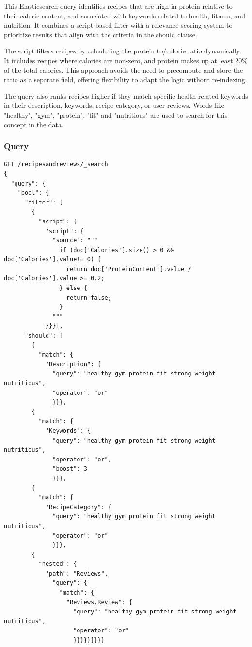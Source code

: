 \begin{enumerate}
    This Elasticsearch query identifies recipes that are high in protein relative to their calorie content, and associated with keywords related to health, fitness, and nutrition. It combines a script-based filter with a relevance scoring system to prioritize results that align with the criteria in the should clause.

    The script filters recipes by calculating the protein to/calorie ratio dynamically. It includes recipes where calories are non-zero, and protein makes up at least 20\% of the total calories. This approach avoids the need to precompute and store the ratio as a separate field, offering flexibility to adapt the logic without re-indexing. 

    The query also ranks recipes higher if they match specific health-related keywords in their description, keywords, recipe category, or user reviews. Words like "healthy", "gym", "protein", "fit" and "nutritious" are used to search for this concept in the data.

    \subsubsection{Query}
    \begin{lstlisting}[language=Elasticsearch]
GET /recipesandreviews/_search
{
  "query": {
    "bool": {
      "filter": [
        {
          "script": {
            "script": {
              "source": """
                if (doc['Calories'].size() > 0 && doc['Calories'].value!= 0) {
                  return doc['ProteinContent'].value / doc['Calories'].value >= 0.2;
                } else {
                  return false;
                }
              """
            }}}],
      "should": [
        {
          "match": {
            "Description": {
              "query": "healthy gym protein fit strong weight nutritious",
              "operator": "or"
              }}},
        {
          "match": {
            "Keywords": {
              "query": "healthy gym protein fit strong weight nutritious",
              "operator": "or",
              "boost": 3
              }}},
        {
          "match": {
            "RecipeCategory": {
              "query": "healthy gym protein fit strong weight nutritious",
              "operator": "or"
              }}},
        {
          "nested": {
            "path": "Reviews",
              "query": {
                "match": {
                  "Reviews.Review": {
                    "query": "healthy gym protein fit strong weight nutritious",
                    "operator": "or"
                    }}}}}]}}}
    \end{lstlisting}


\end{enumerate}
